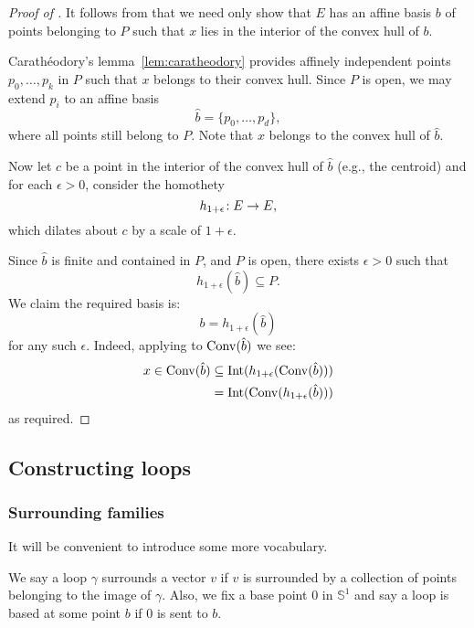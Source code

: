 \begin{proof}[Proof of ]
  \leanok
  It follows from  that we need only show that $E$
  has an affine basis $b$ of points belonging to $P$ such that $x$ lies in
  the interior of the convex hull of $b$.

  Carathéodory's lemma~\ref{lem:caratheodory} provides affinely independent
  points $p_0, \dots, p_k$ in $P$ such that $x$ belongs to their convex
  hull. Since $P$ is open, we may extend $p_i$ to an affine basis
  \[
    \hat b = \{p_0, \ldots, p_d\},
  \]
  where all points still belong to $P$.
  Note that $x$ belongs to the convex hull of $\hat b$.

  Now let $c$ be a point in the interior of the convex hull of $\hat b$
  (e.g., the centroid) and for each $\epsilon > 0$, consider the homothety
  \[
    h_{1+\epsilon} \!: E \to E,
  \]
  which dilates about $c$ by a scale of $1 + \epsilon$.

  Since $\hat b$ is finite and contained in $P$, and $P$ is open, there exists
  $\epsilon > 0$ such that
  \[
    h_{1+\epsilon} (\hat b) \subseteq P.
  \]
  We claim the required basis is:
  \[
    b = h_{1+\epsilon} (\hat b)
  \]
  for any such $\epsilon$. Indeed, applying
   to $\operatorname{Conv}(\hat b)$ we see:
  \begin{align*}
    x \in \operatorname{Conv}(\hat b) &\subseteq \operatorname{Int} (h_{1+\epsilon} (\operatorname{Conv}(\hat b)))\\
                  &= \operatorname{Int} (\operatorname{Conv}(h_{1+\epsilon} (\hat b)))
  \end{align*}
  as required.
\end{proof}


\subsection{Constructing loops}

\subsubsection*{Surrounding families}

It will be convenient to introduce some more vocabulary.

\begin{definition}
  \label{def:surrounds}
  \leanok
  We say a loop $γ$ surrounds a vector $v$ if $v$ is surrounded
  by a collection of points belonging to the image of $γ$.
  Also, we fix a base point $0$ in $𝕊^1$ and say a loop is based at some
  point $b$ if $0$ is sent to $b$.
\end{definition}

